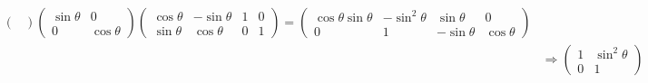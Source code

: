 ﻿\documentclass{book} \usepackage{exsheets} \usepackage{xeCJK}
\begin{document}
\begin{solution}
\begin{align*}
\begin{pmatrix}
                                                                              \end{pmatrix}
                                                                                    \begin{pmatrix}
                                                                                      \sin\theta&0\\
                                                                                      0&\cos\theta
                                                                                    \end{pmatrix}
                                                                                         \begin{pmatrix}
                                                                                           \cos\theta&-\sin\theta&1&0\\
                                                                                           \sin\theta&\cos\theta&0&1
                                                                                         \end{pmatrix}=
                                                                                                                    \begin{pmatrix}
                                                                                                                      \cos\theta\sin\theta&-\sin^2\theta&\sin\theta&0\\
                                                                                                                      0&1&-\sin\theta&\cos\theta
                                                                                                                    \end{pmatrix}\\&\Rightarrow
                                                                                                                                     \begin{pmatrix}
                                                                                                                                       1&\sin^2\theta\\
                                                                                                                                       0&1
                                                                                                                                     \end{pmatrix}

\end{align*}
\end{solution}
\end{document}
